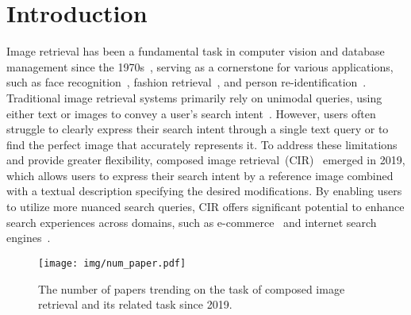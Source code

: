 \label{sec: intro}
\section{Introduction}

Image retrieval has been a fundamental task in computer vision and database management since the 1970s~\cite{datta2008image}, serving as a cornerstone for various applications, such as face recognition~\cite{fu2021dvg}, fashion retrieval~\cite{yang2020generative}, and person re-identification~\cite{li2019pose}. Traditional image retrieval systems primarily rely on unimodal queries, using either text or images to convey a user's search intent~\cite{chua1994content, qu2021dynamic, qu2020context, rao2022does}. However, users often struggle to clearly express their search intent through a single text query or to find the perfect image that accurately represents it.
To address these limitations and provide greater flexibility, composed image retrieval~(CIR)~\cite{vo2019tirg} emerged in 2019, which allows users to express their search intent by a reference image combined with a textual description specifying the desired modifications. By enabling users to utilize more nuanced search queries, CIR offers significant potential to enhance search experiences across domains, such as e-commerce~\cite{du2023multi} and internet search engines~\cite{jandial2022sac,wu2021fiq,weicom, shf}. 


\begin{figure}[!t]
		\centering
		\texttt{[image: img/num\_paper.pdf]}
         
	    \caption{The number of papers trending on the task of composed image retrieval and its related task since 2019.}\label{paper_num}
\end{figure}

